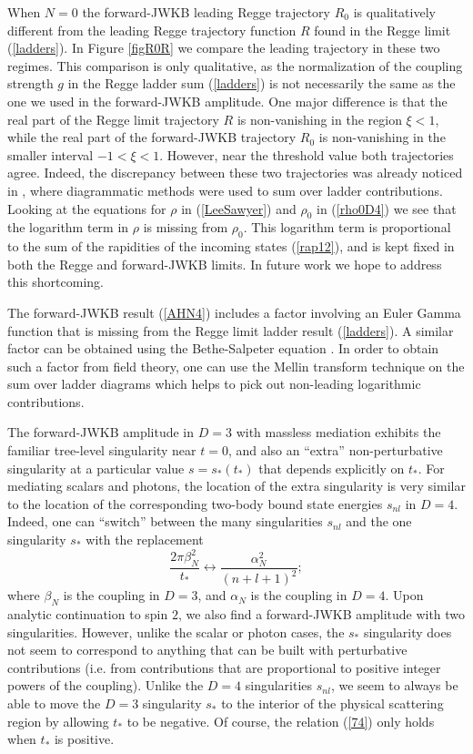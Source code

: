 When $N = 0$ the forward-JWKB leading Regge trajectory $R_{0}$ is qualitatively different from the leading Regge trajectory function $R$ found in the Regge limit (\ref{ladders}). In Figure \ref{figR0R} we compare the leading trajectory in these two regimes. This comparison is only qualitative, as the normalization of the coupling strength $g$ in the Regge ladder sum (\ref{ladders}) is not necessarily the same as the one we used in the forward-JWKB amplitude. One major difference is that the real part of the Regge limit trajectory $R$ is non-vanishing in the region $\xi < 1$, while the real part of the forward-JWKB trajectory $R_{0}$ is non-vanishing in the smaller interval $-1 < \xi < 1$. However, near the threshold value both trajectories agree. Indeed, the discrepancy between these two trajectories was already noticed in \cite{Levy:1970yn}, where diagrammatic methods were used to sum over ladder contributions. Looking at the equations for $\rho$ in (\ref{LeeSawyer}) and $\rho_{0}$ in (\ref{rho0D4}) we see that the logarithm term in $\rho$ is missing from $\rho_{0}$. This logarithm term is proportional to the sum of the rapidities of the incoming states (\ref{rap12}), and is kept fixed in both the Regge and forward-JWKB limits. In future work we hope to address this shortcoming.

The forward-JWKB result (\ref{AHN4}) includes a factor involving an Euler Gamma function that is missing from the Regge limit ladder result (\ref{ladders}). A similar factor can be obtained using the Bethe-Salpeter equation \cite{LeeSawyer}. In order to obtain such a factor from field theory, one can use the Mellin transform technique \cite{BjorkenWu,TruemanYao} on the sum over ladder diagrams \cite{Polkinghorne1,Polkinghorne2} which helps to pick out non-leading logarithmic contributions.

The forward-JWKB amplitude in $D = 3$ with massless mediation exhibits the familiar tree-level singularity near $t = 0$, and also an ``extra'' non-perturbative singularity at a particular value $s = s_{*}(t_{*})$ that depends explicitly on $t_{*}$. For mediating scalars and photons, the location of the extra singularity is very similar to the location of the corresponding two-body bound state energies $s_{nl}$ in $D = 4$. Indeed, one can ``switch'' between the many singularities $s_{nl}$ and the one singularity $s_{*}$ with the replacement
\begin{equation}
	\frac{2 \pi \beta^{2}_{N}}{t_{*}} \longleftrightarrow \frac{\alpha^{2}_{N}}{(n + l + 1)^{2}};
	\label{74}
\end{equation}
where $\beta_{N}$ is the coupling in $D = 3$, and $\alpha_{N}$ is the coupling in $D = 4$. Upon analytic continuation to spin $2$, we also find a forward-JWKB amplitude with two singularities. However, unlike the scalar or photon cases, the $s_{*}$ singularity does not seem to correspond to anything that can be built with perturbative contributions (i.e. from contributions that are proportional to positive integer powers of the coupling). Unlike the $D = 4$ singularities $s_{nl}$, we seem to always be able to move the $D = 3$ singularity $s_{*}$ to the interior of the physical scattering region by allowing $t_{*}$ to be negative. Of course, the relation (\ref{74}) only holds when $t_{*}$ is positive.

